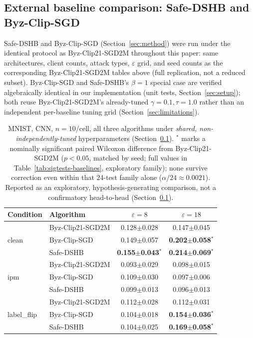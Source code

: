 \documentclass{article}
\begin{document}
\subsection{External baseline comparison: Safe-DSHB and Byz-Clip-SGD}
\label{sec:baselines}
Safe-DSHB \citep{allouah2023trilemma} and Byz-Clip-SGD \citep{islamov2026byzclip}
(Section~\ref{sec:method}) were run under the identical protocol as
Byz-Clip21-SGD2M throughout this paper: same architectures, client counts,
attack types, $\varepsilon$ grid, and seed counts as the corresponding
Byz-Clip21-SGD2M tables above (full replication, not a reduced subset).
Byz-Clip-SGD and Safe-DSHB's $\beta{=}1$ special case are verified
algebraically identical in our implementation (unit tests,
Section~\ref{sec:setup}); both reuse Byz-Clip21-SGD2M's already-tuned
$\gamma{=}0.1,\tau{=}1.0$ rather than an independent per-baseline tuning grid
(Section~\ref{sec:limitations}).

\begin{table}[t]
\centering\small
\begin{tabular}{llcc}
\toprule
Condition & Algorithm & $\varepsilon{=}8$ & $\varepsilon{=}18$ \\
\midrule
\multirow{3}{*}{clean}
 & Byz-Clip21-SGD2M & 0.128$\pm$0.028 & 0.147$\pm$0.045 \\
 & Byz-Clip-SGD     & 0.149$\pm$0.057 & \textbf{0.202$\pm$0.058}$^\ast$ \\
 & Safe-DSHB        & \textbf{0.155$\pm$0.043}$^\ast$ & \textbf{0.214$\pm$0.069}$^\ast$ \\
\multirow{3}{*}{ipm}
 & Byz-Clip21-SGD2M & 0.093$\pm$0.029 & 0.098$\pm$0.015 \\
 & Byz-Clip-SGD     & 0.109$\pm$0.030 & 0.097$\pm$0.006 \\
 & Safe-DSHB        & 0.099$\pm$0.013 & 0.096$\pm$0.013 \\
\multirow{3}{*}{label\_flip}
 & Byz-Clip21-SGD2M & 0.112$\pm$0.028 & 0.112$\pm$0.031 \\
 & Byz-Clip-SGD     & 0.104$\pm$0.018 & \textbf{0.154$\pm$0.036}$^\ast$ \\
 & Safe-DSHB        & 0.104$\pm$0.025 & \textbf{0.169$\pm$0.058}$^\ast$ \\
\bottomrule
\end{tabular}
\caption{MNIST, CNN, $n{=}10$/cell, all three algorithms under \emph{shared,
non-independently-tuned} hyperparameters (Section~\ref{sec:baselines}).
$^\ast$ marks a nominally significant paired Wilcoxon difference from
Byz-Clip21-SGD2M ($p<0.05$, matched by seed; full values in
Table~\ref{tab:sigtests-baselines}, exploratory family); none survive
correction even within that 24-test family alone
($\alpha/24\approx0.0021$). Reported as an exploratory, hypothesis-generating
comparison, not a confirmatory head-to-head (Section~\ref{sec:baselines}).}
\label{tab:baseline-mnist}
\end{table}
\end{document}
